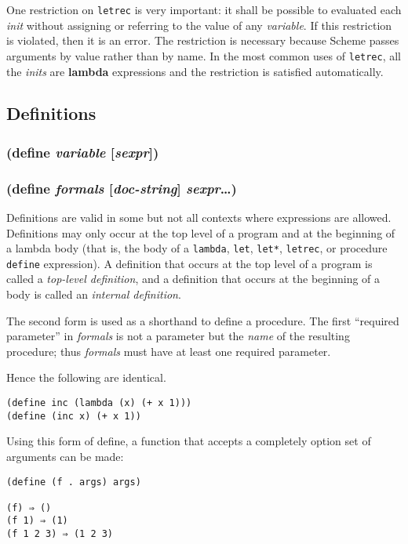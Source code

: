 \documentclass{article}
\begin{document}
One restriction on \verb|letrec| is very important: it shall be possible to evaluated each
\emph{init} without assigning or referring to the value of any \emph{variable}. If this
restriction is violated, then it is an error. The restriction is necessary because Scheme
passes arguments by value rather than by name. In the most common uses of \verb|letrec|, all
the \emph{inits} are \textbf{lambda} expressions and the restriction is satisfied
automatically.

\subsection{Definitions}\label{sec:definitions}

\subsubsection{(define \emph{variable} [\emph{sexpr}])}

\subsubsection{(define \emph{formals} [\emph{doc-string}] \emph{sexpr}\ldots{})}

Definitions are valid in some but not all contexts where expressions are allowed. Definitions
may only occur at the top level of a program and at the beginning of a lambda body (that is,
the body of a \verb|lambda|, \verb|let|, \verb|let*|, \verb|letrec|, or procedure
\verb|define| expression). A definition that occurs at the top level of a program is called a
\emph{top-level definition}, and a definition that occurs at the beginning of a body is called
an \emph{internal definition}.

The second form is used as a shorthand to define a procedure. The first ``required parameter''
in \emph{formals} is not a parameter but the \emph{name} of the resulting procedure; thus
\emph{formals} must have at least one required parameter.

Hence the following are identical.

\begin{verbatim}
(define inc (lambda (x) (+ x 1)))
(define (inc x) (+ x 1))
\end{verbatim}

Using this form of define, a function that accepts a completely option set of arguments can be made:

\begin{verbatim}
(define (f . args) args)

(f) ⇒ ()
(f 1) ⇒ (1)
(f 1 2 3) ⇒ (1 2 3)
\end{verbatim}
\end{document}
